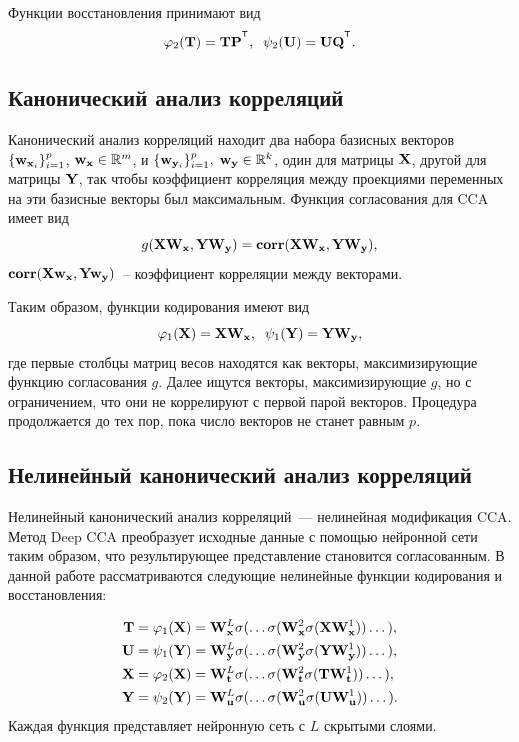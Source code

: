 Функции восстановления принимают вид
\begin{equation*}
	\varphi_2(\bT) = \bT\bP^{\T}, \;\;
	\psi_2(\bU) = \bU \bQ^{\T}.
\end{equation*}

\subsection{Канонический анализ корреляций}

Канонический анализ корреляций находит два набора базисных векторов $\{\mathbf{w}_{\mathbf{x}_i}\}_{i=1}^{p}$, $\mathbf{w}_{\mathbf{x}} \in \mathbb{R}^{m}$, и $\{\mathbf{w}_{\mathbf{y}_i}\}_{i=1}^{p}, \; \mathbf{w}_{\mathbf{y}} \in \mathbb{R}^{k}$, один для матрицы $\mathbf{X}$, другой для матрицы $\mathbf{Y}$, так чтобы коэффициент корреляция между проекциями переменных на эти базисные векторы был максимальным. Функция согласования для CCA имеет вид
\begin{equation*}
	g(\mathbf{X} \mathbf{W}_{\mathbf{x}}, \mathbf{Y} \mathbf{W}_{\mathbf{y}}) = \textbf{corr}(\mathbf{X} \mathbf{W}_{\mathbf{x}}, \mathbf{Y} \mathbf{W}_{\mathbf{y}}),
\end{equation*}
 $\textbf{corr}(\mathbf{X} \mathbf{w}_{\mathbf{x}}, \mathbf{Y} \mathbf{w}_{\mathbf{y}})$~-- коэффициент корреляции между векторами.

Таким образом, функции кодирования имеют вид
\begin{equation*}
	\varphi_1(\mathbf{X}) = \mathbf{X} \mathbf{W}_{\mathbf{x}} , \;\;
	\psi_1(\mathbf{Y}) = \mathbf{Y} \mathbf{W}_{\mathbf{y}},
\end{equation*}
где первые столбцы матриц весов находятся как векторы, максимизирующие функцию согласования $g$. Далее ищутся векторы, максимизирующие $g$, но с ограничением, что они не коррелируют с первой парой векторов. Процедура продолжается до тех пор, пока число векторов не станет равным $p$.

\subsection{Нелинейный канонический анализ корреляций}

Нелинейный канонический анализ корреляций~--- нелинейная модификация CCA. Метод Deep CCA преобразует исходные данные с помощью нейронной сети таким образом, что результирующее представление становится согласованным. В данной работе рассматриваются следующие нелинейные функции кодирования и восстановления:

\begin{align*}
	\mathbf{T} &= \varphi_1(\mathbf{X}) =  \mathbf{W}_{\mathbf{x}}^L \sigma(\dots \sigma(\mathbf{W}_{\mathbf{x}}^2 \sigma(\mathbf{X} \mathbf{W}_{\mathbf{x}}^1)) \dots ), \\
	\mathbf{U} &= \psi_1(\mathbf{Y}) =  \mathbf{W}_{\mathbf{y}}^L \sigma(\dots \sigma(\mathbf{W}_{\mathbf{y}}^2 \sigma(\mathbf{Y} \mathbf{W}_{\mathbf{y}}^1)) \dots ), \\
	\mathbf{X} &= \varphi_2(\mathbf{X}) =  \mathbf{W}_{\mathbf{t}}^L \sigma(\dots \sigma(\mathbf{W}_{\mathbf{t}}^2 \sigma(\mathbf{T} \mathbf{W}_{\mathbf{t}}^1)) \dots ), \\
	\mathbf{Y} &= \psi_2(\mathbf{Y}) =  \mathbf{W}_{\mathbf{u}}^L \sigma(\dots \sigma(\mathbf{W}_{\mathbf{u}}^2 \sigma(\mathbf{U} \mathbf{W}_{\mathbf{u}}^1)) \dots ).
\end{align*}
Каждая функция представляет нейронную сеть с $L$ скрытыми слоями.

